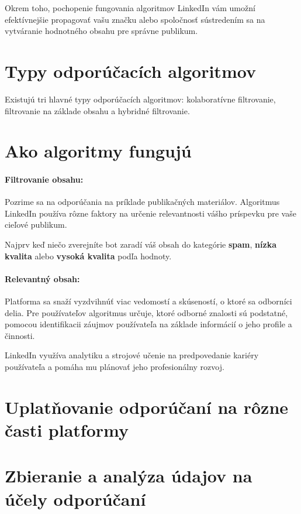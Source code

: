 \documentclass[twoside,slovak,a4paper]{coursepaper}
\begin{document}
Okrem toho, pochopenie fungovania algoritmov LinkedIn vám umožní efektívnejšie propagovať vašu značku alebo spoločnosť sústredením sa na vytváranie hodnotného obsahu pre správne publikum.


\section{Typy odporúčacích algoritmov} \label{Typy}
Existujú tri hlavné typy odporúčacích algoritmov: kolaboratívne filtrovanie, filtrovanie na základe obsahu a hybridné filtrovanie. 

\section{Ako algoritmy fungujú} \label{fungovanie}
\paragraph{Filtrovanie obsahu:}
Pozrime sa na odporúčania na príklade publikačných materiálov. Algoritmus LinkedIn používa rôzne faktory na určenie relevantnosti vášho príspevku pre vaše cieľové publikum.

Najprv keď niečo zverejníte bot zaradí váš obsah do kategórie \textbf{spam}, \textbf{nízka kvalita} alebo \textbf{vysoká kvalita} podľa hodnoty. ~\cite{Terez:article}

\paragraph{Relevantný obsah:}Platforma sa snaží vyzdvihnúť viac vedomostí a skúseností, o ktoré sa odborníci delia. Pre používateľov algoritmus určuje, ktoré odborné znalosti sú podstatné, pomocou identifikacii záujmov používateľa na základe informácií o jeho profile a činnosti.

LinkedIn využíva analytiku a strojové učenie na predpovedanie kariéry používateľa a pomáha mu plánovať jeho profesionálny rozvoj.	

\section{Uplatňovanie odporúčaní na rôzne časti platformy} \label{Uplatňovanie}


\section{Zbieranie a analýza údajov na účely odporúčaní} \label{analýza údajov}
 
\end{document}

